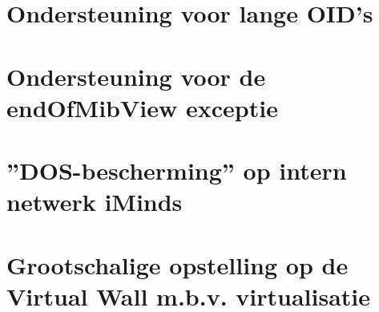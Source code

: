 \section{Ondersteuning voor lange OID's}
\label{probleem-lange-oids}

\section{Ondersteuning voor de endOfMibView exceptie}
\label{probleem-endofmibview-exceptie}

\section{''DOS-bescherming'' op intern netwerk iMinds}
\label{probleem-dos-bescherming}


\section{Grootschalige opstelling op de Virtual Wall m.b.v. virtualisatie}
\label{probleem-virtualisatie-vwall}

